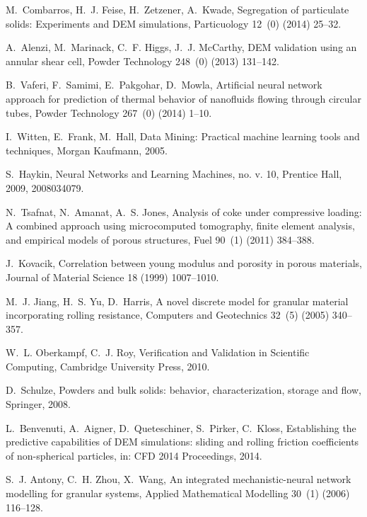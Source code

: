 \documentclass{llncs}
\begin{document}
\begin{thebibliography}{10}
M.~Combarros, H.~J. Feise, H.~Zetzener, A.~Kwade, Segregation of particulate
  solids: Experiments and DEM simulations, Particuology 12~(0) (2014) 25--32.

A.~Alenzi, M.~Marinack, C.~F. Higgs, J.~J. McCarthy, DEM validation using an
  annular shear cell, Powder Technology 248~(0) (2013) 131--142.

B.~Vaferi, F.~Samimi, E.~Pakgohar, D.~Mowla, Artificial neural network approach
  for prediction of thermal behavior of nanofluids flowing through circular
  tubes, Powder Technology 267~(0) (2014) 1--10.

I.~Witten, E.~Frank, M.~Hall, Data Mining: Practical machine learning tools and
  techniques, Morgan Kaufmann, 2005.

S.~Haykin, Neural Networks and Learning Machines, no. v. 10, Prentice Hall,
  2009, 2008034079.

N.~Tsafnat, N.~Amanat, A.~S. Jones, Analysis of coke under compressive loading:
  A combined approach using microcomputed tomography, finite element analysis,
  and empirical models of porous structures, Fuel 90~(1) (2011) 384--388.

J.~Kovacik, Correlation between young modulus and porosity in porous materials,
  Journal of Material Science 18 (1999) 1007--1010.

M.~J. Jiang, H.~S. Yu, D.~Harris, A novel discrete model for granular material
  incorporating rolling resistance, Computers and Geotechnics 32~(5) (2005)
  340--357.

W.~L. Oberkampf, C.~J. Roy, Verification and Validation in Scientific
  Computing, Cambridge University Press, 2010.

D.~Schulze, Powders and bulk solids: behavior, characterization, storage and
  flow, Springer, 2008.

L.~Benvenuti, A.~Aigner, D.~Queteschiner, S.~Pirker, C.~Kloss, Establishing the
  predictive capabilities of DEM simulations: sliding and rolling friction
  coefficients of non-spherical particles, in: CFD 2014 Proceedings, 2014.

S.~J. Antony, C.~H. Zhou, X.~Wang, An integrated mechanistic-neural network
  modelling for granular systems, Applied Mathematical Modelling 30~(1) (2006)
  116--128.


\end{thebibliography}
\end{document}
